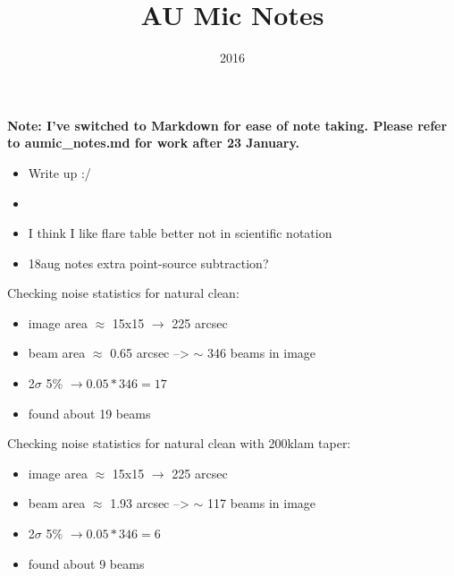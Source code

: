 \documentclass[a4paper]{tufte-handout}
\title{AU Mic Notes}
\date{2016}
\begin{document}
\maketitle

\textbf{Note: I've switched to Markdown for ease of note taking. Please refer to aumic\_notes.md for work after 23 January.}

\begin{tasks}
	\begin{itemize}
		\item Write up :/
	\end{itemize}
\end{tasks}


\begin{maybe}
	\begin{itemize}
		\item
	\end{itemize}
\end{maybe}


\begin{mer}
	\begin{itemize}
		\item I think I like flare table better not in scientific notation
    \item 18aug notes extra point-source subtraction?
	\end{itemize}

\end{mer}

Checking noise statistics for natural clean:\\
\begin{itemize}
  \item image area $\approx$ 15x15 $\to$ 225 arcsec
  \item beam area $\approx$ 0.65 arcsec --> $\sim$ 346 beams in image
  \item 2$\sigma$ 5\% $\to 0.05 * 346 = 17$
  \item found about 19 beams
\end{itemize}

\noindent Checking noise statistics for natural clean with 200klam taper:\\
\begin{itemize}
  \item image area $\approx$ 15x15 $\to$ 225 arcsec
  \item beam area $\approx$ 1.93 arcsec --> $\sim$ 117 beams in image
  \item 2$\sigma$ 5\% $\to 0.05 * 346 = 6$
  \item found about 9 beams
\end{itemize}
\end{document}
